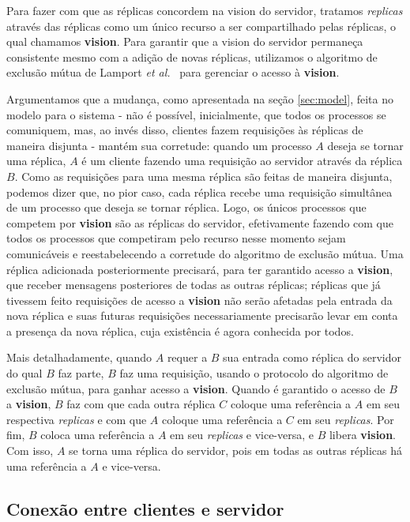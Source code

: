 \documentclass[../main.tex]{subfiles}
\begin{document}
Para fazer com que as réplicas concordem na vision do servidor, tratamos \textit{replicas} através das réplicas como um único recurso a ser compartilhado pelas réplicas, o qual chamamos \textbf{vision}.
Para garantir que a vision do servidor permaneça consistente mesmo com a adição de novas réplicas, utilizamos o algoritmo de exclusão mútua de Lamport \textit{et al.}~\cite{lamport-logical-clocks} para gerenciar o acesso à \textbf{vision}.

Argumentamos que a mudança, como apresentada na seção \ref{sec:model}, feita no modelo para o sistema - não é possível, inicialmente, que todos os processos se comuniquem, mas, ao invés disso, clientes fazem requisições às réplicas de maneira disjunta - mantém sua corretude: quando um processo $A$ deseja se tornar uma réplica, $A$ é um cliente fazendo uma requisição ao servidor através da réplica $B$.
Como as requisições para uma mesma réplica são feitas de maneira disjunta, podemos dizer que, no pior caso, cada réplica recebe uma requisição simultânea de um processo que deseja se tornar réplica.
Logo, os únicos processos que competem por \textbf{vision} são as réplicas do servidor, efetivamente fazendo com que todos os processos que competiram pelo recurso nesse momento sejam comunicáveis e reestabelecendo a corretude do algoritmo de exclusão mútua.
Uma réplica adicionada posteriormente precisará, para ter garantido acesso a \textbf{vision}, que receber mensagens posteriores de todas as outras réplicas; réplicas que já tivessem feito requisições de acesso a \textbf{vision} não serão afetadas pela entrada da nova réplica e suas futuras requisições necessariamente precisarão levar em conta a presença da nova réplica, cuja existência é agora conhecida por todos.

Mais detalhadamente, quando $A$ requer a $B$ sua entrada como réplica do servidor do qual $B$ faz parte, $B$ faz uma requisição, usando o protocolo do algoritmo de exclusão mútua, para ganhar acesso a \textbf{vision}.
Quando é garantido o acesso de $B$ a \textbf{vision}, $B$ faz com que cada outra réplica $C$ coloque uma referência a $A$ em seu respectiva \textit{replicas} e com que $A$ coloque uma referência a $C$ em seu \textit{replicas}.
Por fim, $B$ coloca uma referência a $A$ em seu \textit{replicas} e vice-versa, e $B$ libera \textbf{vision}.
Com isso, $A$ se torna uma réplica do servidor, pois em todas as outras réplicas há uma referência a $A$ e vice-versa.

\subsection{Conexão entre clientes e servidor}
\end{document}
